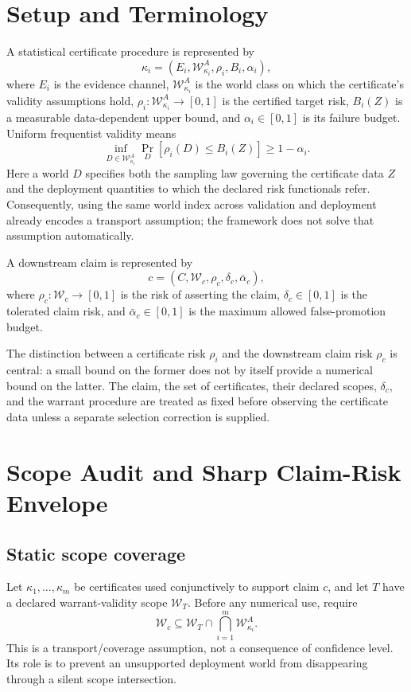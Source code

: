 \documentclass[10pt]{article}
\newcommand{\Wc}{\mathcal W_c}
\newcommand{\WT}{\mathcal W_T}
\newcommand{\riskc}{\rho_c}
\begin{document}
\section{Setup and Terminology}

A statistical certificate procedure is represented by
\[
\kappa_i
=
(E_i,\mathcal W_{\kappa_i}^{A},\rho_i,B_i,\alpha_i),
\]
where \(E_i\) is the evidence channel,
\(\mathcal W_{\kappa_i}^{A}\) is the world class on which the certificate's
validity assumptions hold,
\(\rho_i:\mathcal W_{\kappa_i}^{A}\to[0,1]\) is the certified target
risk, \(B_i(Z)\) is a measurable data-dependent upper bound, and
\(\alpha_i\in[0,1]\) is its failure budget. Uniform frequentist validity
means
\[
\inf_{D\in\mathcal W_{\kappa_i}^{A}}
\Pr_D\!\left[\rho_i(D)\le B_i(Z)\right]
\ge 1-\alpha_i.
\]
Here a world \(D\) specifies both the sampling law governing the certificate
data \(Z\) and the deployment quantities to which the declared risk
functionals refer.  Consequently, using the same world index across validation
and deployment already encodes a transport assumption; the framework does not
solve that assumption automatically.

A downstream claim is represented by
\[
c=(C,\Wc,\riskc,\delta_c,\bar\alpha_c),
\]
where \(\riskc:\Wc\to[0,1]\) is the risk of asserting the claim,
\(\delta_c\in[0,1]\) is the tolerated claim risk, and
\(\bar\alpha_c\in[0,1]\) is the maximum allowed false-promotion budget.

The distinction between a certificate risk \(\rho_i\) and the downstream
claim risk \(\riskc\) is central: a small bound on the former does not by
itself provide a numerical bound on the latter.  The claim, the set of
certificates, their declared scopes, \(\delta_c\), and the warrant procedure
are treated as fixed before observing the certificate data unless a separate
selection correction is supplied.

\section{Scope Audit and Sharp Claim-Risk Envelope}

\subsection{Static scope coverage}

Let \(\kappa_1,\ldots,\kappa_m\) be certificates used conjunctively to
support claim \(c\), and let \(T\) have a declared warrant-validity scope
\(\WT\).  Before any numerical use, require
\[
\boxed{
\Wc
\subseteq
\WT
\cap
\bigcap_{i=1}^{m}\mathcal W_{\kappa_i}^{A}.
}
\]
This is a transport/coverage assumption, not a consequence of confidence
level.  Its role is to prevent an unsupported deployment world from
disappearing through a silent scope intersection.
\end{document}
